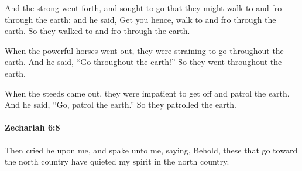			\begin{versebox}
					\item[BHS] 
					\item[LXX] 
					\item[ASV] And the strong went forth, and sought to go that they might walk to and fro through the earth: and he said, Get you hence, walk to and fro through the earth. So they walked to and fro through the earth.
					\item[NIV] When the powerful horses went out, they were straining to go throughout the earth. And he said, “Go throughout the earth!” So they went throughout the earth.
					\item[NRSV] When the steeds came out, they were impatient to get off and patrol the earth. And he said, “Go, patrol the earth.” So they patrolled the earth.
			\end{versebox}

		\paragraph{Zechariah 6:8} %
			\label{ZECHARIAH-6-8}

			Then cried he upon me, and spake unto me, saying, Behold, these that go toward the north country have quieted my spirit in the north country.

